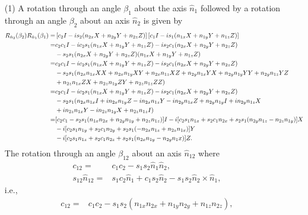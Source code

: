\documentclass[en]{sol-man}
\begin{document}
\begin{pf}
    \begin{itemize}
        \item[(1)] A rotation through an angle $\beta_1$ about the axis $\hat{n}_1$ followed by a rotation through an angle $\beta_2$ about an axis $\hat{n}_2$ is given by
        \begin{align}
            \notag R_{\hat{n}_2}(\beta_2)R_{\hat{n}_1}(\beta_1)=&\left[c_2I-is_2(n_{2x}X+n_{2y}Y+n_{2z}Z)\right]\left[c_1I-is_1(n_{1x}X+n_{1y}Y+n_{1z}Z)\right]\\
            \notag=&c_2c_1I-ic_2s_1(n_{1x}X+n_{1y}Y+n_{1z}Z)-is_2c_1(n_{2x}X+n_{2y}Y+n_{2z}Z)\\
            \notag&-s_2s_1(n_{2x}X+n_{2y}Y+n_{2z}Z)(n_{1x}X+n_{1y}Y+n_{1z}Z)\\
            \notag=&c_2c_1I-ic_2s_1(n_{1x}X+n_{1y}Y+n_{1z}Z)-is_2c_1(n_{2x}X+n_{2y}Y+n_{2z}Z)\\
            \notag&-s_2s_1(n_{2x}n_{1x}XX+n_{2x}n_{1y}XY+n_{2x}n_{1z}XZ+n_{2y}n_{1x}YX+n_{2y}n_{1y}YY+n_{2y}n_{1z}YZ\\
            \notag&+n_{2z}n_{1x}ZX+n_{2z}n_{1y}ZY+n_{2z}n_{1z}ZZ)\\
            \notag=&c_2c_1I-ic_2s_1(n_{1x}X+n_{1y}Y+n_{1z}Z)-is_2c_1(n_{2x}X+n_{2y}Y+n_{2z}Z)\\
            \notag&-s_2s_1(n_{2x}n_{1x}I+in_{2x}n_{1y}Z-in_{2x}n_{1z}Y-in_{2y}n_{1x}Z+n_{2y}n_{1y}I+in_{2y}n_{1z}X\\
            \notag&+in_{2z}n_{1x}Y-in_{2z}n_{1y}X+n_{2z}n_{1z}I)\\
            \notag=&[c_2c_1-s_2s_1(n_{1x}n_{2x}+n_{2y}n_{1y}+n_{2z}n_{1z})]I-i[c_2s_1n_{1x}+s_2c_1n_{2x}+s_2s_1(n_{2y}n_{1z}-n_{2z}n_{1y})]X\\
            \notag&-i[c_2s_1n_{1y}+s_2c_1n_{2y}+s_2s_1(-n_{2x}n_{1z}+n_{2z}n_{1x})]Y\\
            &-i[c_2s_1n_{1z}+s_2c_1n_{2z}+s_2s_1(n_{2x}n_{1y}-n_{2y}n_1x)]Z.
        \end{align}
        The rotation through an angle $\beta_{12}$ about an axis $\hat{n}_{12}$ where
        \begin{align}
            c_{12}=&c_1c_2-s_1s_2\hat{n}_1\hat{n}_2,\\
            s_{12}\hat{n}_{12}=&s_1c_2\hat{n}_1+c_1s_2\hat{n}_2-s_1s_2\hat{n}_2\times\hat{n}_1,
        \end{align}
        i.e.,
        \begin{align}
            c_{12}=&c_1c_2-s_1s_2(n_{1x}n_{2x}+n_{1y}n_{2y}+n_{1z}n_{2z}),\\

\end{align}
\end{itemize}
\end{pf}
\end{document}
